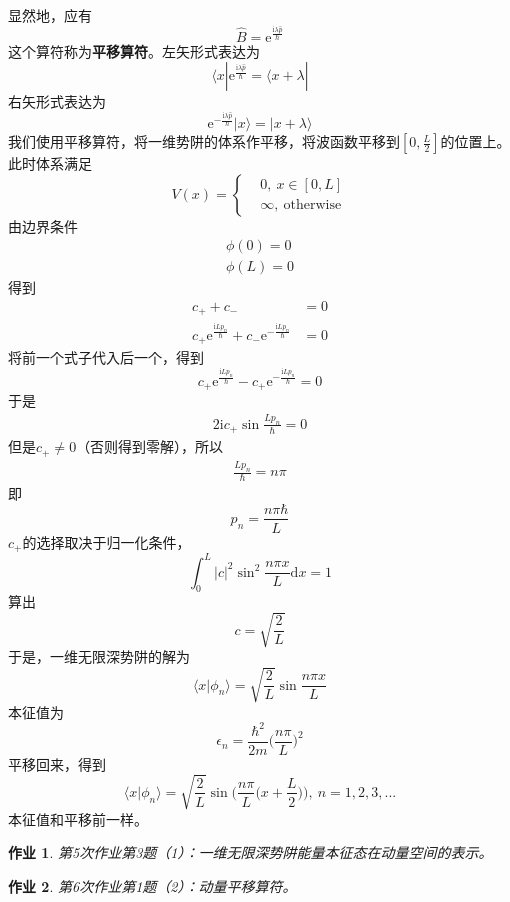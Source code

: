 \documentclass[12pt]{article}
\newtheorem{asg}{作业}
\begin{document}
    显然地，应有
    \begin{equation}
        \hat{B} = \mathrm{e}^{\frac {\mathrm{i}\lambda \hat{p}}{\hbar}}
    \end{equation}
    这个算符称为\textbf{平移算符}。左矢形式表达为
    \[ \langle x| \mathrm{e}^{\frac {\mathrm{i}\lambda \hat{p}}{\hbar}} = \langle x+\lambda| \]
    右矢形式表达为
    \[ \mathrm{e}^{-\frac {\mathrm{i}\lambda \hat{p}}{\hbar}} | x\rangle = |x+\lambda \rangle \]
    我们使用平移算符，将一维势阱的体系作平移，将波函数平移到$[0,\frac L2]$的位置上。此时体系满足
    \begin{equation}
        V(x) = \left \{
            \begin{aligned}
                &0,\ x\in [0, L]\\
                &\infty, \ \mathrm{otherwise}
            \end{aligned}
            \right.
    \end{equation}
    由边界条件
    \begin{equation}\begin{aligned}
        \phi(0)= 0\\
        \phi(L) = 0
    \end{aligned}\end{equation}
    得到
    \begin{equation}\begin{aligned}
        c_+ +c_- &= 0\\
        c_+\mathrm{e}^{\frac {\mathrm{i}Lp_n}{\hbar}}+c_-\mathrm{e}^{-\frac {\mathrm{i}Lp_n}{\hbar}} &= 0
    \end{aligned}\end{equation}
    将前一个式子代入后一个，得到
    \[ c_+\mathrm{e}^{\frac {\mathrm{i}Lp_n}{\hbar}}-c_+ \mathrm{e}^{-\frac {\mathrm{i}Lp_n}{\hbar}} = 0 \]
    于是
    \begin{equation}\begin{aligned}
        2\mathrm{i}c_+ \sin{\frac {Lp_n}{\hbar}} = 0
    \end{aligned}\end{equation}
    但是$c_+ \neq 0$（否则得到零解），所以
    \begin{equation}\begin{aligned}
        \frac {Lp_n}{\hbar} = n\pi
    \end{aligned}\end{equation}
    即
    \[ p_n = \frac {n\pi \hbar}{L} \]
    $c_+$的选择取决于归一化条件，
    \[ \int_0^L |c|^2 \sin^2{\frac {n\pi x}L}\mathrm{d}x = 1 \]
    算出
    \[ c = \sqrt{\frac 2L} \]
    于是，一维无限深势阱的解为
    \[ \langle x|\phi_n \rangle = \sqrt{\frac 2L} \sin{\frac {n\pi x}L} \]
    本征值为
    \[ \epsilon_n = \frac {\hbar^2}{2m} \bigg(\frac {n\pi}L\bigg)^2 \]
    平移回来，得到
    \[ \langle x|\phi_n \rangle = \sqrt{\frac 2L} \sin{\bigg(\frac {n\pi}L\bigg(x+\frac L2\bigg)\bigg)}, \ n=1,2,3,... \]
    本征值和平移前一样。
    \begin{asg}
        第5次作业第3题（1）：一维无限深势阱能量本征态在动量空间的表示。
    \end{asg}
    \begin{asg}
        第6次作业第1题（2）：动量平移算符。
    \end{asg}
\end{document}
